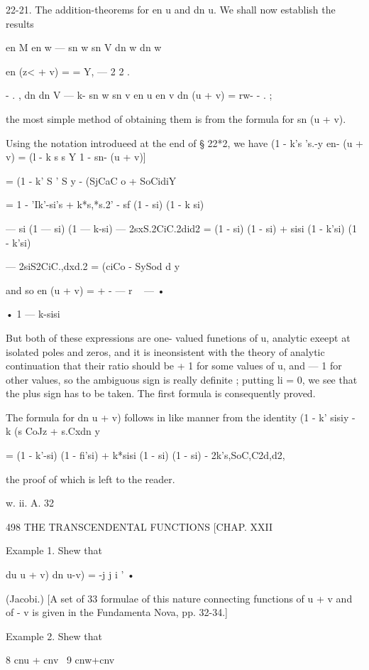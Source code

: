 22-21. The addition-theorems for en u and dn u. 
We shall now establish the results 

en M en w — sn w sn V dn w dn w 

en (z< + v) = = Y, — 2 2 . 

- . , dn    dn V — k- sn w sn v en u en v 
dn (u + v) =   rw- - . ; 

the most simple method of obtaining them is from the formula for sn (u + v). 

Using the notation introdueed at the end of § 22*2, we have 
(1 - k's 's.-y en- (u + v) = (l - k s  s Y  1 - sn- (u + v)] 

= (1 - k' S ' S y - (SjCaC o + SoCidiY 

= 1 - 'Ik'-si's  + k*s,*s.2' - sf (1 - si) (1 - k si) 

— si (1 — si) (1 — k-si) — 2sxS.2CiC.2did2 
= (1 - si) (1 - si) + sisi (1 - k'si) (1 - k'si) 

— 2siS2CiC.,dxd.2 
= (ciCo - SySod d y 

and so en (u + v) = + -  — r ~ — • 

• 1 — k-sisi 

But both of these expressions are one- valued funetions of u, analytic 
exeept at isolated poles and zeros, and it is ineonsistent with the theory 
of analytic continuation that their ratio should be + 1 for some values of u, 
and — 1 for other values, so the ambiguous sign is really definite ; putting 
li = 0, we see that the plus sign has to be taken. The first formula is 
consequently proved. 

The formula for dn  u + v) follows in like manner from the identity 
(1 - k' sisiy - k  (s CoJz + s.Cxdn y 

= (1 - k'-si) (1 - fi'si) + k*sisi (1 - si) (1 - si) - 2k's,SoC,C2d,d2, 

the proof of which is left to the reader. 

w. ii. A. 32 



498 THE TRANSCENDENTAL FUNCTIONS [CHAP. XXII 

Example 1. Shew that 

du  u + v) dn  u-v) = -j j i ' • 

(Jacobi.) 
[A set of 33 formulae of this nature connecting functions of u + v and of  - v is given 
in the Fundamenta Nova, pp. 32-34.] 

Example 2. Shew that 

8 cnu + cnv \  9 cnw+cnv 

